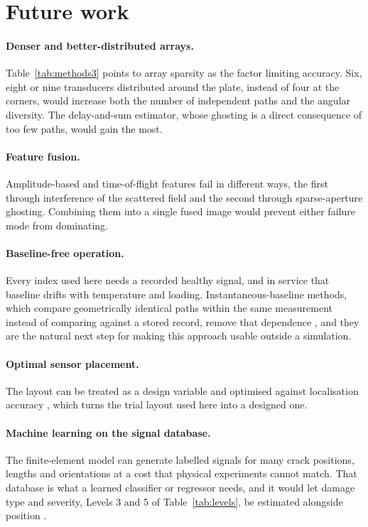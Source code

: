 \section{Future work}

\paragraph{Denser and better-distributed arrays.}
Table~\ref{tab:methods3} points to array sparsity as the factor limiting accuracy. Six, eight or nine
transducers distributed around the plate, instead of four at the corners, would increase both the number of
independent paths and the angular diversity. The delay-and-sum estimator, whose ghosting is a direct
consequence of too few paths, would gain the most.

\paragraph{Feature fusion.}
Amplitude-based and time-of-flight features fail in different ways, the first through interference of the
scattered field and the second through sparse-aperture ghosting. Combining them into a single fused image
would prevent either failure mode from dominating.

\paragraph{Baseline-free operation.}
Every index used here needs a recorded healthy signal, and in service that baseline drifts with temperature
and loading. Instantaneous-baseline methods, which compare geometrically identical paths within the same
measurement instead of comparing against a stored record, remove that dependence
\cite{Alem2016,Alem2017,Alem2021}, and they are the natural next step for making this approach usable
outside a simulation.

\paragraph{Optimal sensor placement.}
The layout can be treated as a design variable and optimised against localisation accuracy
\cite{Motamed2019,Hassani2023Opt}, which turns the trial layout used here into a designed one.

\paragraph{Machine learning on the signal database.}
The finite-element model can generate labelled signals for many crack positions, lengths and orientations at a
cost that physical experiments cannot match. That database is what a learned classifier or regressor needs,
and it would let damage type and severity, Levels 3 and 5 of Table~\ref{tab:levels}, be estimated alongside
position \cite{Jia2023,YangZ2023}.
